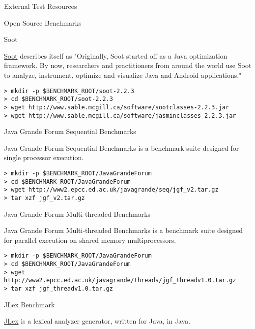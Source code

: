 \begin{section}{External Test Resources}
\begin{subsection}{Open Source Benchmarks}
\begin{subsubsection}{Soot}

\href{http://sable.github.io/soot/}{Soot} describes itself as "Originally, Soot started off as a Java optimization framework. By now, researchers and practitioners from around the world use Soot to analyze, instrument, optimize and visualize Java and Android applications."

\begin{lstlisting}
> mkdir -p $BENCHMARK_ROOT/soot-2.2.3
> cd $BENCHMARK_ROOT/soot-2.2.3
> wget http://www.sable.mcgill.ca/software/sootclasses-2.2.3.jar
> wget http://www.sable.mcgill.ca/software/jasminclasses-2.2.3.jar
\end{lstlisting}

\end{subsubsection}

\begin{subsubsection}{Java Grande Forum Sequential Benchmarks}

Java Grande Forum Sequential Benchmarks is a benchmark suite designed for single processor execution.

\begin{lstlisting}
> mkdir -p $BENCHMARK_ROOT/JavaGrandeForum
> cd $BENCHMARK_ROOT/JavaGrandeForum
> wget http://www2.epcc.ed.ac.uk/javagrande/seq/jgf_v2.tar.gz
> tar xzf jgf_v2.tar.gz
\end{lstlisting}

\end{subsubsection}

\begin{subsubsection}{Java Grande Forum Multi-threaded Benchmarks}

Java Grande Forum Multi-threaded Benchmarks is a benchmark suite designed for parallel execution on shared memory multiprocessors.

\begin{lstlisting}
> mkdir -p $BENCHMARK_ROOT/JavaGrandeForum
> cd $BENCHMARK_ROOT/JavaGrandeForum
> wget http://www2.epcc.ed.ac.uk/javagrande/threads/jgf_threadv1.0.tar.gz
> tar xzf jgf_threadv1.0.tar.gz
\end{lstlisting}

\end{subsubsection}

\begin{subsubsection}{JLex Benchmark}

\href{http://www.cs.princeton.edu/~appel/modern/java/JLex/}{JLex} is a lexical analyzer generator, written for Java, in Java.


\end{subsubsection}
\end{subsection}
\end{section}
